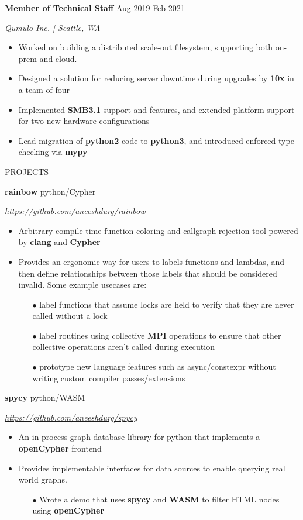 \documentclass[paper=a4,fontsize=11pt]{scrartcl} %
\newcommand{\NewPart}[1]{ \noindent \large \usefont{OT1}{phv}{b}{n}\uppercase{#1} \normalfont \normalsize}
\newcommand{\EducationEntry}[4]{
		\noindent \textbf{#1}     %
			\hfill#2 \par  %
		\noindent \textit{#3} \par        %
		\noindent\hangafter=0 \small #4 %
		\normalsize \par}
\begin{document}
\EducationEntry{Member of Technical Staff}{Aug 2019-Feb 2021}{Qumulo Inc. | Seattle, WA}{
\begin{itemize}
  \item Worked on building a distributed scale-out filesystem, supporting both on-prem and cloud.
  \item Designed a solution for reducing server downtime during upgrades by \textbf{10x} in a team of four
  \item Implemented \textbf{SMB3.1} support and features, and extended platform support for two new hardware configurations
  \item Lead migration of \textbf{python2} code to \textbf{python3}, and introduced enforced type checking via \textbf{mypy}
\end{itemize}
}

\vspace{0.75em}
\NewPart{Projects}{}

\EducationEntry{rainbow}{python/Cypher}{\url{https://github.com/aneeshdurg/rainbow}}{
\begin{itemize}
  \item Arbitrary compile-time function coloring and callgraph rejection tool powered by \textbf{clang} and \textbf{Cypher}
\item Provides an ergonomic way for users to labels functions and lambdas, and then define relationships between those labels that should be considered invalid. Some example usecases are:
  \begin{itemize}
    \item[$\bullet$] label functions that assume locks are held to verify that they are never called without a lock
    \item[$\bullet$] label routines using collective \textbf{MPI} operations to ensure that other collective operations aren't called during execution
    \item[$\bullet$] prototype new language features such as async/constexpr without writing custom compiler passes/extensions
  \end{itemize}
\end{itemize}
}

\EducationEntry{spycy}{python/WASM}{\url{https://github.com/aneeshdurg/spycy}}{
\begin{itemize}
  \item An in-process graph database library for python that implements a \textbf{openCypher} frontend
  \item Provides implementable interfaces for data sources to enable querying real world graphs.
  \begin{itemize}
    \item[$\bullet$] Wrote a demo that uses \textbf{spycy} and \textbf{WASM} to filter HTML nodes using \textbf{openCypher}
  \end{itemize}
\end{itemize}
}
\end{document}
